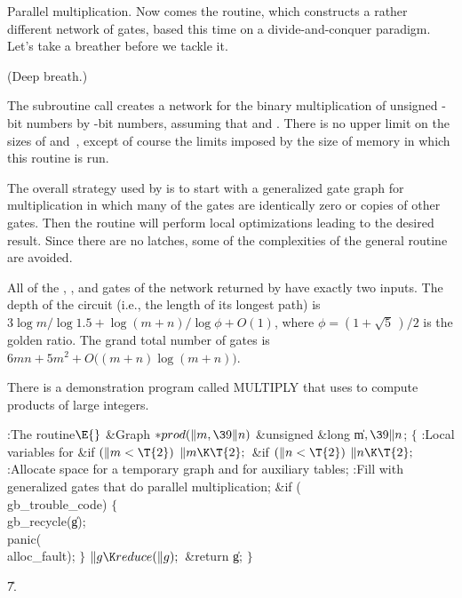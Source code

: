 Parallel multiplication. Now comes the  routine,
which constructs a rather different network of gates, based this time
on a divide-and-conquer paradigm. Let's take a breather before we tackle it.

(Deep breath.)

The subroutine call  creates
a network for the binary multiplication of unsigned
-bit numbers by -bit numbers, assuming that 
and .
There is no upper limit on the sizes of  and~, except of course
the limits imposed by the size of memory in which this routine is run.

The overall strategy used by  is to start with a generalized
gate graph for multiplication in which many of the gates are
identically zero or copies of other gates.  Then the  routine
will perform local optimizations leading to the desired result. Since
there are no latches, some of the complexities of the general 
routine are avoided.

All of the , , and  gates of the network
returned by
 have exactly two inputs. The depth of the circuit (i.e., the
length of its longest path) is $3\log m/\!\log 1.5 + \log(m+n)/\!\log\phi
+O(1)$, where $\phi=(1+\sqrt5\,)/2$ is the golden ratio. The grand total
number of gates is $6mn+5m^2+O\bigl((m+n)\log(m+n)\bigr)$.

There is a demonstration program called {\sc MULTIPLY} that uses 
to
compute products of large integers.

\Y\B\4:The  routine\X${}\E{}$\6
\1\1\&{Graph} ${}{*}\\{prod}(\|m,\39\|n){}$\6
\&{unsigned} \&{long} \|m${},\39\|n{}$;\2\2\6
${}\{{}$\5
\1:Local variables for \X\7
\&{if} ${}(\|m<\T{2}){}$\1\5
${}\|m\K\T{2};{}$\2\6
\&{if} ${}(\|n<\T{2}){}$\1\5
${}\|n\K\T{2};{}$\2\6
:Allocate space for a temporary graph  and for auxiliary tables\X;\6
:Fill  with generalized gates that do parallel multiplication\X;\6
\&{if} (\\{gb\_trouble\_code})\5
${}\{{}$\1\6
\\{gb\_recycle}(\|g);\5
\\{panic}(\\{alloc\_fault});\6
\4${}\}{}$\2\6
${}\|g\K\\{reduce}(\|g);{}$\6
\&{return} \|g;\6
\4${}\}{}$\2\par
\U7.\fi

